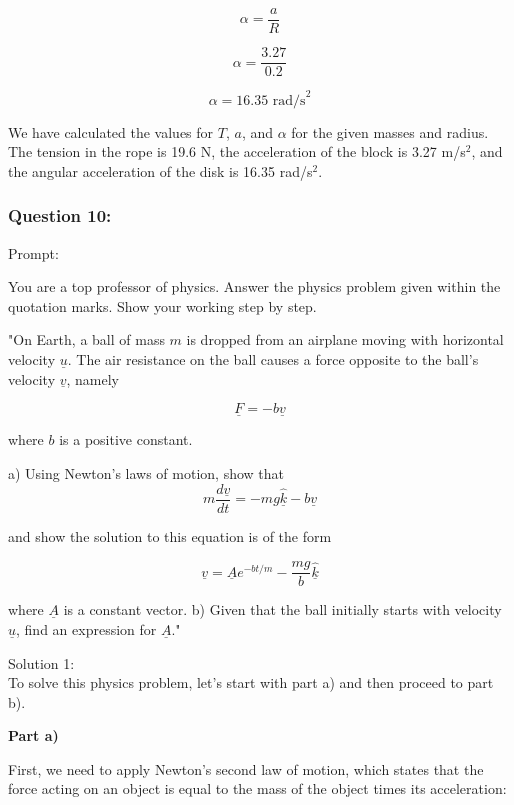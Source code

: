 \documentclass[a4paper,11pt]{article}
\begin{document}
\[
\alpha = \frac{a}{R}
\]

\[
\alpha = \frac{3.27}{0.2}
\]

\[
\alpha = 16.35 \text{ rad/s}^2
\]

We have calculated the values for \( T \), \( a \), and \( \alpha \) for the given masses and radius. The tension in the rope is 19.6 N, the acceleration of the block is 3.27 m/s\(^2\), and the angular acceleration of the disk is 16.35 rad/s\(^2\).

\subsubsection*{Question 10:}

Prompt:
\begin{spverbatim}
    You are a top professor of physics. Answer the physics problem given within the quotation marks. Show your working step by step.

    "On Earth, a ball of mass \( m \) is dropped from an airplane moving with horizontal velocity \( \underline{u} \). The air resistance on the ball causes a force opposite to the ball's velocity \( \underline{v} \), namely 

    \[ \underline{F} = - b \underline{v} \] 
    
    where \( b \) is a positive constant. 
    
    a) Using Newton's laws of motion, show that 
    \[
    m\frac{d\underline{v}}{dt} = - mg \hat{\underline{k}} - b\underline{v} 
    \]
    
    and show the solution to this equation is of the form 
    
    \[
    \underline{v} = \underline{A} e^{-bt/m} - \frac{mg}{b} \hat{\underline{k}} 
    \]
    
    where \( \underline{A} \) is a constant vector.
    b) Given that the ball initially starts with velocity \( \underline{u} \), find an expression for \( \underline{A} \)."
\end{spverbatim}

\bigskip

\noindent Solution 1: \\

To solve this physics problem, let's start with part a) and then proceed to part b).

\textbf{Part a)}

First, we need to apply Newton's second law of motion, which states that the force acting on an object is equal to the mass of the object times its acceleration:
\end{document}
